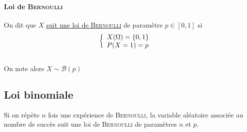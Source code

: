 		\paragraph{Loi de \textsc{Bernoulli}}
			On dit que $X$ \uline{suit une loi de \textsc{Bernoulli}} de paramètre $p\in[0,1]$ si 
			\[ \left\{ \begin{array}{l} X(\Omega) = \{0,1\} \\ P(X=1) = p \end{array} \right. \] \trait
		\vspace*{-1.1cm} \\ On note alors $X\sim \mathcal{B}(p)$
	\subsection{Loi binomiale}
		Si on répète $n$ fois une expérience de \textsc{Bernoulli}, la variable aléatoire associée au nombre de succès suit une loi de \textsc{Bernoulli} de paramètres $n$ et $p$.